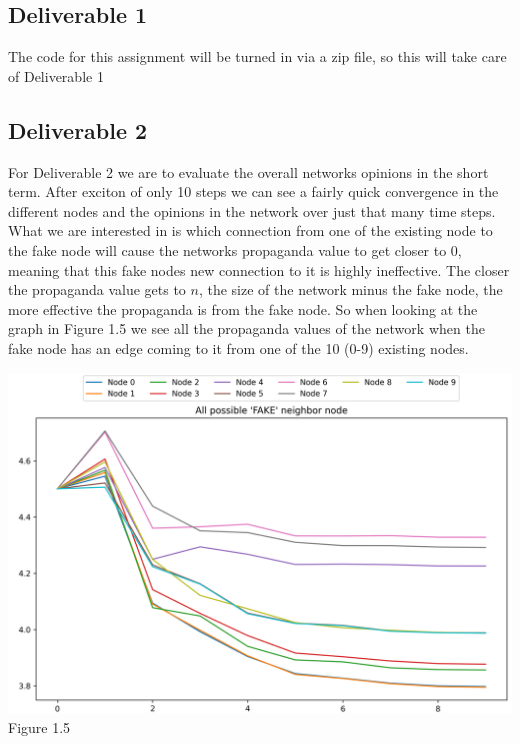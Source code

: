 \documentclass[letterpaper]{article}
\begin{document}
\subsection{ Deliverable 1 }
The code for this assignment will be turned in via a zip file, so this will take care of Deliverable 1

\subsection{ Deliverable 2 }
For Deliverable 2 we are to evaluate the overall networks opinions in the short term.  After exciton of only 10 steps we can see a fairly quick convergence in the different nodes and the opinions in the network over just that many time steps.  What we are interested in is which connection from one of the existing node to the fake node will cause the networks propaganda value to get closer to 0, meaning that this fake nodes new connection to it is highly ineffective.  The closer the propaganda value gets to $n$, the size of the network minus the fake node, the more effective the propaganda is from the fake node. So when looking at the graph in Figure 1.5 we see all the propaganda values of the network when the fake node has an edge coming to it from one of the 10 (0-9) existing nodes.
\begin{center}
	\includegraphics[scale=0.34]{./Images/Figure1.5} \\
	Figure 1.5
\end{center}
\end{document}
